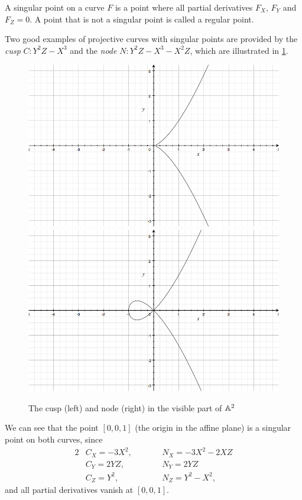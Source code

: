 \begin{definition}
	A singular point on a curve $F$ is a point where all partial derivatives $F_X$, $F_Y$ and $F_Z = 0$.
	A point that is not a singular point is called a regular point.
\end{definition}
Two good examples of projective curves with singular points are provided by the \emph{cusp} $C : Y^2Z - X^3$ and the \emph{node} $N : Y^2Z - X^3 - X^2Z$, which are illustrated in \cref{cuspandnode}.
\begin{figure}[htbp]
	\centering
	\includegraphics[scale=0.25]{../Figures/cusp.jpg}
	\includegraphics[scale=0.25]{../Figures/node.jpg}
	\caption{The cusp (left) and node (right) in the visible part of $\an[2]$}
	\label{cuspandnode}
\end{figure}
We can see that the point $[0,0,1]$ (the origin in the affine plane) is a singular point on both curves, since
\begin{alignat*}{2}
	&C_X = -3X^2,\qquad &&N_X = - 3X^2 - 2XZ\\
	&C_Y = 2YZ,\qquad &&N_Y = 2YZ\\
	&C_Z = Y^2,\qquad &&N_Z = Y^2 -X^2,
\end{alignat*}
and all partial derivatives vanish at $[0,0,1]$.

